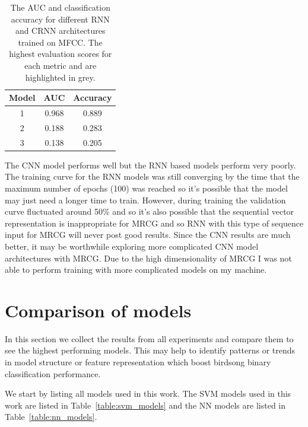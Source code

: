 \begin{table}[ht]
\begin{center}
\begin{tabular}{c c c}
\toprule
Model & AUC & Accuracy \\ [0.5ex]
\midrule
1 & \cellcolor{lightgray} 0.968 & \cellcolor{lightgray} 0.889 \\
2 & 0.188 & 0.283 \\
3 & 0.138 & 0.205 \\
\bottomrule
\end{tabular}
\caption{The AUC and classification accuracy for different RNN and CRNN
architectures trained on MFCC\@. The highest evaluation scores for each metric
and are highlighted in grey.}\label{table:rnn_mrcg_results}
\end{center}
\end{table}

The CNN model performs well but the RNN based models perform very poorly. The
training curve for the RNN models was still converging by the time that the
maximum number of epochs (100) was reached so it's possible that the model may
just need a longer time to train. However, during training the validation curve
fluctuated around 50\% and so it's also possible that the sequential vector
representation is inappropriate for MRCG and so RNN with this type of
sequence input for MRCG will never post good results. Since the CNN results are
much better, it may be worthwhile exploring more complicated CNN model
architectures with MRCG\@. Due to the high dimensionality of MRCG I was not able
to perform training with more complicated models on my machine.

\section{Comparison of models}

In this section we collect the results from all experiments and compare them to
see the highest performing models. This may help to identify patterns or trends
in model structure or feature representation which boost birdsong binary
classification performance.

We start by listing all models used in this work. The SVM models used in this
work are listed in Table~\ref{table:svm_models} and the NN models are listed in
Table~\ref{table:nn_models}.


